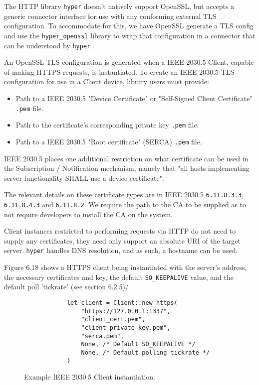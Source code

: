 The HTTP library \texttt{hyper} doesn't natively support OpenSSL, but accepts a generic connector interface for use with any conforming external TLS configuration. To accommodate for this, we have OpenSSL generate a TLS config and use the \texttt{hyper\_openssl} library to wrap that configuration in a connector that can be understood by \texttt{hyper} \cite{hyperopenssl}. 

An OpenSSL TLS configuration is generated when a IEEE 2030.5 Client, capable of making HTTPS requests, is instantiated. To create an IEEE 2030.5 TLS configuration for use in a Client device, library users must provide:

\begin{itemize}
    \item Path to a IEEE 2030.5 "Device Certificate" or "Self-Signed Client Certificate" \texttt{.pem} file.
    \item Path to the certificate's corresponding private key \texttt{.pem} file.
    \item Path to a IEEE 2030.5 "Root certificate" (SERCA) \texttt{.pem} file. 
\end{itemize}

IEEE 2030.5 places one additional restriction on what certificate can be used in the Subscription / Notification mechanism, namely that "all hosts implementing server functionality SHALL use a device certificate".

The relevant details on these certificate types are in IEEE 2030.5 \texttt{6.11.8.3.3}, \texttt{6.11.8.4.3} and \texttt{6.11.8.2}. We require the path to the CA to be supplied as to not require developers to install the CA on the system.

Client instances restricted to performing requests via HTTP do not need to supply any certificates, they need only support an absolute URI of the target server. \texttt{hyper} handles DNS resolution, and as such, a hostname can be used. 

Figure 6.18 shows a HTTPS client being instantiated with the server's address, the necessary certificates and key, the default \texttt{SO\_KEEPALIVE} value, and the default poll 'tickrate' (see section 6.2.5)/  

\begin{figure}[h]
    \begin{center}
        \begin{lstlisting}
            let client = Client::new_https(
                "https://127.0.0.1:1337",
                "client_cert.pem",
                "client_private_key.pem",
                "serca.pem",
                None, /* Default SO_KEEPALIVE */
                None, /* Default polling tickrate */
            )
        \end{lstlisting}
        \label{fig:httpsclientexample}
        \vspace{-10pt}
        \caption{Example IEEE 2030.5 Client instantiation.}
    \end{center}
\end{figure}


